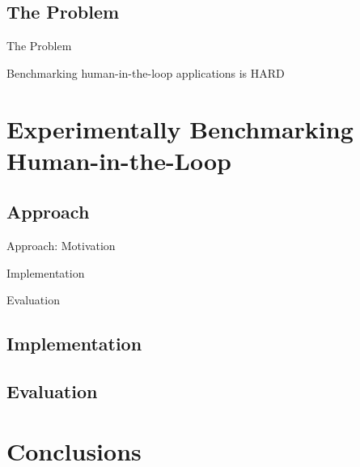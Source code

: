 \documentclass[aspectratio=1610]{beamer}
\begin{document}
\subsection{The Problem}
\begin{frame}{The Problem}
    \begin{Large}
        \centering%
        Benchmarking human-in-the-loop applications is HARD\\
    \end{Large}
\end{frame}
\section{Experimentally Benchmarking Human-in-the-Loop}
\subsection{Approach}

\begin{frame}{Approach: Motivation}
    \begin{center}
    \end{center}
\end{frame}

\begin{frame}{Implementation}

\end{frame}

\begin{frame}{Evaluation}

\end{frame}


\subsection{Implementation}
\subsection{Evaluation}
\section{Conclusions}
\end{document}
